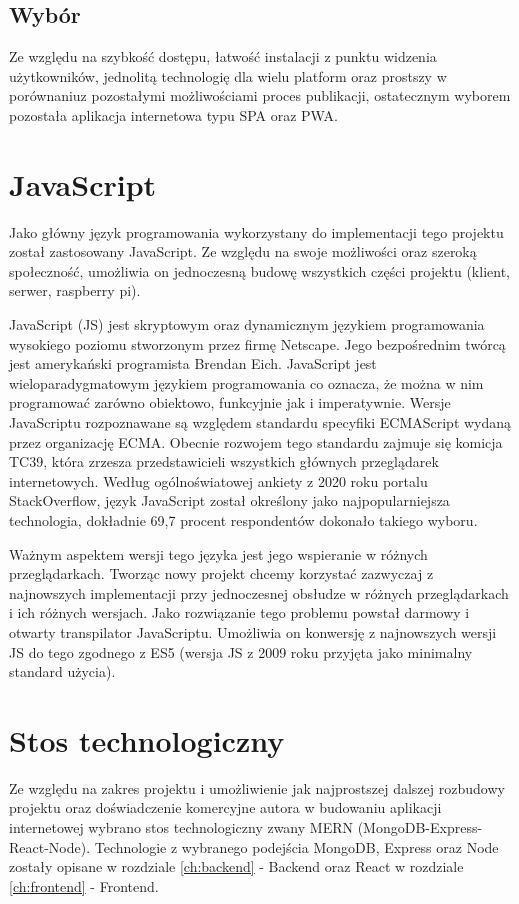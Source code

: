 \subsection{Wybór}
Ze względu na szybkość dostępu, łatwość instalacji z punktu widzenia użytkowników, jednolitą technologię dla wielu platform oraz prostszy w porównaniu\newline z pozostałymi możliwościami proces publikacji, ostatecznym wyborem pozostała aplikacja internetowa typu SPA oraz PWA.

\section{JavaScript}
Jako główny język programowania wykorzystany do implementacji tego projektu został zastosowany JavaScript. Ze względu na swoje możliwości oraz szeroką społeczność, umożliwia on jednoczesną budowę wszystkich części projektu (klient, serwer, raspberry pi).

JavaScript (JS) jest skryptowym oraz dynamicznym językiem programowania wysokiego poziomu stworzonym przez firmę Netscape. Jego bezpośrednim twórcą jest amerykański programista Brendan Eich. JavaScript jest wieloparadygmatowym językiem programowania co oznacza, że można w nim programować zarówno obiektowo, funkcyjnie jak i imperatywnie. Wersje JavaScriptu rozpoznawane są względem standardu specyfiki ECMAScript wydaną przez organizację ECMA. Obecnie rozwojem tego standardu zajmuje się komicja TC39, która zrzesza przedstawicieli wszystkich głównych przeglądarek internetowych. \cite{JavaScriptBasics} Według ogólnoświatowej ankiety z 2020 roku portalu StackOverflow, język JavaScript został określony jako najpopularniejsza technologia, dokładnie 69,7 procent respondentów dokonało takiego wyboru. \cite{StackOverflowSurvey}

Ważnym aspektem wersji tego języka jest jego wspieranie w różnych przeglądarkach. Tworząc nowy projekt chcemy korzystać zazwyczaj z najnowszych implementacji przy jednoczesnej obsłudze w różnych przeglądarkach i ich różnych wersjach. Jako rozwiązanie tego problemu powstał darmowy i otwarty transpilator JavaScriptu. Umożliwia on konwersję z najnowszych wersji JS do tego zgodnego z ES5 (wersja JS z 2009 roku przyjęta jako minimalny standard użycia).

\section{Stos technologiczny}
Ze względu na zakres projektu i umożliwienie jak najprostszej dalszej rozbudowy projektu oraz doświadczenie komercyjne autora w budowaniu aplikacji internetowej wybrano stos technologiczny zwany MERN (MongoDB-Express-React-Node). Technologie z wybranego podejścia MongoDB, Express oraz Node zostały opisane w rozdziale \ref{ch:backend} - Backend oraz React w rozdziale \ref{ch:frontend} - Frontend.

